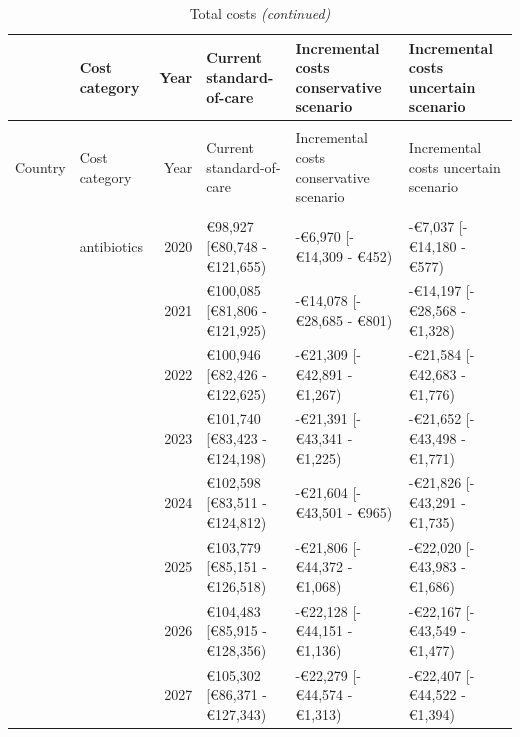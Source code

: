 \documentclass[
]{article}
\begin{document}
\begin{landscape}\begingroup\fontsize{7}{9}\selectfont

\begin{longtable}[t]{llrlll}
\caption{\label{tab:total-costs}Total costs}\\
\toprule
 & Cost category & Year & Current standard-of-care & Incremental costs conservative scenario & Incremental costs uncertain scenario\\
\midrule
\endfirsthead
\caption[]{\label{tab:total-costs}Total costs \textit{(continued)}}\\
\toprule
Country & Cost category & Year & Current standard-of-care & Incremental costs conservative scenario & Incremental costs uncertain scenario\\
\midrule
\endhead

\endfoot
\bottomrule
\endlastfoot
\addlinespace[0.3em]
\multicolumn{6}{l}{\textbf{Netherlands}}\\
\hspace{1em} & antibiotics & 2020 & €98,927 [€80,748 - €121,655) & -€6,970 [-€14,309 - €452) & -€7,037 [-€14,180 - €577)\\
\cmidrule{3-6}\nopagebreak
\hspace{1em} &  & 2021 & €100,085 [€81,806 - €121,925) & -€14,078 [-€28,685 - €801) & -€14,197 [-€28,568 - €1,328)\\
\cmidrule{3-6}\nopagebreak
\hspace{1em} &  & 2022 & €100,946 [€82,426 - €122,625) & -€21,309 [-€42,891 - €1,267) & -€21,584 [-€42,683 - €1,776)\\
\cmidrule{3-6}\nopagebreak
\hspace{1em} &  & 2023 & €101,740 [€83,423 - €124,198) & -€21,391 [-€43,341 - €1,225) & -€21,652 [-€43,498 - €1,771)\\
\cmidrule{3-6}\nopagebreak
\hspace{1em} &  & 2024 & €102,598 [€83,511 - €124,812) & -€21,604 [-€43,501 - €965) & -€21,826 [-€43,291 - €1,735)\\
\cmidrule{3-6}\nopagebreak
\hspace{1em} &  & 2025 & €103,779 [€85,151 - €126,518) & -€21,806 [-€44,372 - €1,068) & -€22,020 [-€43,983 - €1,686)\\
\cmidrule{3-6}\nopagebreak
\hspace{1em} &  & 2026 & €104,483 [€85,915 - €128,356) & -€22,128 [-€44,151 - €1,136) & -€22,167 [-€43,549 - €1,477)\\
\cmidrule{3-6}\nopagebreak
\hspace{1em} &  & 2027 & €105,302 [€86,371 - €127,343) & -€22,279 [-€44,574 - €1,313) & -€22,407 [-€44,522 - €1,394)\\

\end{longtable}
\end{landscape}
\end{document}
